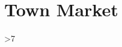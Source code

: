 \section*{Town Market}

\hint{\showCycle}

\begin{multicols}{3}

\townPitOfJustice

\townBeasts

\townSquare

\innOne

\tavernOne

\tavernTwo

\innTwo

\randomize
\ifnum\value{r12}>7
  \townDoula
\fi

\end{multicols}

\bigLine

\begin{multicols}{2}

\townHealers

\townDocks

\townCuriosity

\townSignage

\townBeasts

\townTanner

\townWeavers

\townArmoury

\end{multicols}

\bigLine
\begin{multicols}{2}

\townGuardArms

\fightAdvert

\end{multicols}

\townGuardProjectiles
